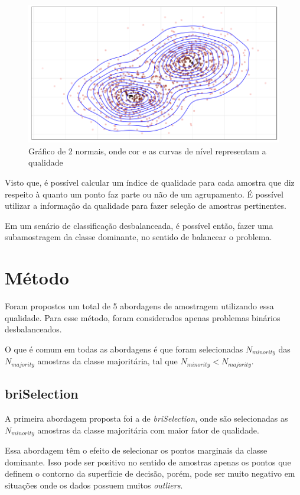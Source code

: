 \documentclass[]{article}
\begin{document}
	\begin{figure}[H]
		\includegraphics[width=\linewidth]{imgs/qualidade_plot.png}
		\caption{Gráfico de 2 normais, onde cor e as curvas de nível representam a qualidade}
		\label{fig:qplot}
	\end{figure}
	
	Visto que, é possível calcular um índice de qualidade para cada amostra que diz respeito à quanto um ponto faz parte ou não de um agrupamento. É possível utilizar a informação da qualidade para fazer seleção de amostras pertinentes.
	
	Em um senário de classificação desbalanceada, é possível então, fazer uma subamostragem da classe dominante, no sentido de balancear o problema. 
	
	\section{Método}
	Foram propostos um total de 5 abordagens de amostragem utilizando essa qualidade. Para esse método, foram considerados apenas problemas binários desbalanceados. 
	
	O que é comum em todas as abordagens é que foram selecionadas $N_{minority}$ das $N_{majority}$ amostras da classe majoritária, tal que $N_{minority} < N_{majority}$.
	
	\subsection{briSelection} 
	
	A primeira abordagem proposta foi a de \textit{briSelection}, onde são selecionadas as $N_{minority}$ amostras da classe majoritária com maior fator de qualidade. 
	
	Essa abordagem têm o efeito de selecionar os pontos marginais da classe dominante. Isso pode ser positivo no sentido de amostras apenas os pontos que definem o contorno da superfície de decisão, porém, pode ser muito negativo em situações onde os dados possuem muitos \textit{outliers}. 
	
\end{document}
